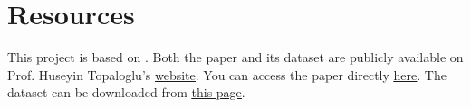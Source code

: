 \documentclass[11pt]{article}
\begin{document}
\newpage

\section{Resources}

This project is based on \cite{topaloglu2009using}.
Both the paper and its dataset are publicly available on Prof. Huseyin Topaloglu's \underline{\href{https://people.orie.cornell.edu/huseyin}{website}}. 
You can access the paper directly \underline{\href{https://people.orie.cornell.edu/huseyin/publications/revenue_man.pdf}{here}}.
The dataset can be downloaded from \underline{\href{https://people.orie.cornell.edu/huseyin/research/rm_datasets/rm_datasets.html}{this page}}.

\vspace{0.5cm}






\end{document}

